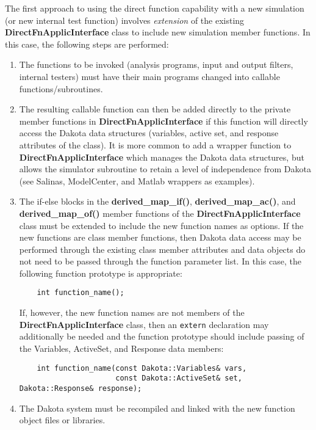 The first approach to using the direct function capability with a new
simulation (or new internal test function) involves \emph{extension}
of the existing \textbf{DirectFnApplicInterface} class to include new
simulation member functions. In this case, the following steps are
performed:
\begin{enumerate}
\item The functions to be invoked (analysis programs, input and
  output filters, internal testers) must have their main programs
  changed into callable functions/subroutines.

\item The resulting callable function can then be added directly
  to the private member functions in \textbf{DirectFnApplicInterface}
  if this function will directly access the Dakota data structures
  (variables, active set, and response attributes of the class). It is
  more common to add a wrapper function to
  \textbf{DirectFnApplicInterface} which manages the Dakota data
  structures, but allows the simulator subroutine to retain a level of
  independence from Dakota (see Salinas, ModelCenter, and Matlab
  wrappers as examples).

\item The if-else blocks in the \textbf{derived\_map\_if()},
  \textbf{derived\_map\_ac()}, and \textbf{derived\_map\_of()} member
  functions of the \textbf{DirectFnApplicInterface} class must be
  extended to include the new function names as options. If the new
  functions are class member functions, then Dakota data access may be
  performed through the existing class member attributes and data
  objects do not need to be passed through the function parameter
  list. In this case, the following function prototype is appropriate:
\begin{small}
\begin{verbatim}
    int function_name();
\end{verbatim}
\end{small}
  If, however, the new function names are not members of the
  \textbf{DirectFnApplicInterface} class, then an \texttt{extern}
  declaration may additionally be needed and the function prototype
  should include passing of the Variables, ActiveSet, and Response
  data members:
\begin{small}
\begin{verbatim}
    int function_name(const Dakota::Variables& vars,
                      const Dakota::ActiveSet& set, Dakota::Response& response);
\end{verbatim}
\end{small}

\item The Dakota system must be recompiled and linked with the new
  function object files or libraries.
\end{enumerate}

